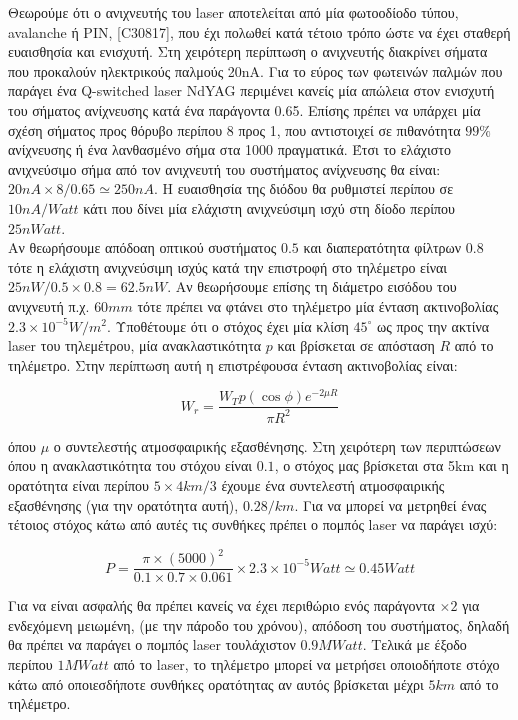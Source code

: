 \documentclass[a4paper,11pt,titlepage]{article}
\newcommand{\degrees}{^{\circ}}
\begin{document}
Θεωρούμε ότι ο ανιχνευτής του laser αποτελείται από μία φωτοοδίοδο τύπου, avalanche ή PIN, [C30817], που έχι πολωθεί κατά τέτοιο τρόπο ώστε να έχει σταθερή ευαισθησία και ενισχυτή. Στη χειρότερη περίπτωση ο ανιχνευτής διακρίνει σήματα που προκαλούν ηλεκτρικούς παλμούς 20nA. Για το εύρος των φωτεινών παλμών που παράγει ένα Q-switched laser NdYAG περιμένει κανείς μία απώλεια στον ενισχυτή του σήματος ανίχνευσης κατά ένα παράγοντα 0.65. Επίσης πρέπει να υπάρχει μία σχέση σήματος προς θόρυβο περίπου 8 προς 1, που αντιστοιχεί σε πιθανότητα $99\%$ ανίχνευσης ή ένα λανθασμένο σήμα στα 1000 πραγματικά. Έτσι το ελάχιστο ανιχνεύσιμο σήμα από τον ανιχνευτή του συστήματος ανίχνευσης θα είναι: $20nA\times8/0.65\simeq250nA$. Η ευαισθησία της διόδου θα ρυθμιστεί περίπου σε $10nA/Watt$ κάτι που δίνει μία ελάχιστη ανιχνεύσιμη ισχύ στη δίοδο περίπου $25nWatt$.\\
Αν θεωρήσουμε απόδοαη οπτικού συστήματος $0.5$ και διαπερατότητα φίλτρων $0.8$ τότε η ελάχιστη ανιχνεύσιμη ισχύς κατά την επιστροφή στο τηλέμετρο είναι $25nW/0.5\times0.8=62.5nW$. Αν θεωρήσουμε επίσης τη διάμετρο εισόδου του ανιχνευτή π.χ. $60mm$ τότε πρέπει να φτάνει στο τηλέμετρο μία ένταση ακτινοβολίας $2.3\times10^{-5}W/m^2$. Υποθέτουμε ότι ο στόχος έχει μία κλίση $45\degrees$ ως προς την ακτίνα laser του τηλεμέτρου, μία ανακλαστικότητα $p$ και βρίσκεται σε απόσταση $R$ από το τηλέμετρο. Στην περίπτωση αυτή η επιστρέφουσα ένταση ακτινοβολίας είναι:

\begin{equation}
  W_r=\dfrac{W_T p (\cos\phi)e^{-2\mu R}}{\pi R^2}
\end{equation}

όπου $\mu$ ο συντελεστής ατμοσφαιρικής εξασθένησης. Στη χειρότερη των περιπτώσεων όπου η ανακλαστικότητα του στόχου είναι $0.1$, ο στόχος μας βρίσκεται στα 5km και η ορατότητα είναι περίπου $5\times4km/3$ έχουμε ένα συντελεστή ατμοσφαιρικής εξασθένησης (για την ορατότητα αυτή), $0.28/km$. Για να μπορεί να μετρηθεί ένας τέτοιος στόχος κάτω από αυτές τις συνθήκες πρέπει ο πομπός laser να παράγει ισχύ:

\begin{equation}
 P=\frac{\pi\times(5000)^2}{0.1\times0.7\times0.061}\times2.3\times10^{-5}Watt\simeq0.45Watt
\end{equation}

Για να είναι ασφαλής θα πρέπει κανείς να έχει περιθώριο ενός παράγοντα $\times2$ για ενδεχόμενη μειωμένη, (με την πάροδο του χρόνου), απόδοση του συστήματος, δηλαδή θα πρέπει να παράγει ο πομπός laser τουλάχιστον $0.9MWatt$. Τελικά με έξοδο περίπου $1MWatt$ από το laser, το τηλέμετρο μπορεί να μετρήσει οποιοδήποτε στόχο κάτω από οποιεσδήποτε συνθήκες ορατότητας αν αυτός βρίσκεται μέχρι $5km$ από το τηλέμετρο.
\end{document}
